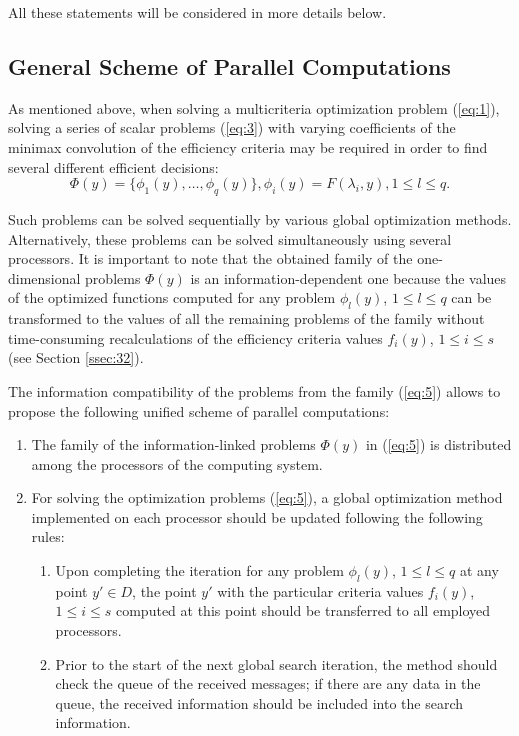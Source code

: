All these statements will be considered in more details below.


\subsection{General Scheme of Parallel Computations }
\label{ssec:31}

As mentioned above, when solving a multicriteria optimization problem (\ref{eq:1}), solving a series of scalar problems (\ref{eq:3}) with varying coefficients of the minimax convolution of the efficiency criteria may be required in order to find several different efficient decisions:
\begin{equation}
\Phi(y)=\{\phi_1 (y),\dots,\phi_q(y) \}, \phi_i(y)=F(\lambda_i,y), 1 \leq l \leq q.
\label{eq:5}
\end{equation}

Such problems can be solved sequentially by various global optimization methods. Alternatively, these problems can be solved simultaneously using several processors. It is important to note that the obtained family of the one-dimensional problems $\Phi(y)$ is an information-dependent one because the values of the optimized functions computed for any problem $\phi_l (y)$, $1 \leq l \leq q$ can be transformed to the values of all the remaining problems of the family without time-consuming recalculations of the efficiency criteria values $f_i (y)$, $1 \leq i \leq s$ (see Section \ref{ssec:32}).

The information compatibility of the problems from the family (\ref{eq:5}) allows to propose the following unified scheme of parallel computations:
\begin{enumerate}
	\item The family of the information-linked problems $\Phi(y)$ in (\ref{eq:5}) is distributed among the processors of the computing system. 
  \item For solving the optimization problems (\ref{eq:5}), a global optimization method implemented on each processor should be updated following the following rules:
  \begin{enumerate}
		\item Upon completing the iteration for any problem $\phi_l(y)$, $1 \leq l \leq q$ at any point $y' \in D$, the point $y'$ with the particular criteria values $f_i(y)$, $1 \leq i \leq s$ computed at this point should be transferred to all employed processors.
	  \item Prior to the start of the next global search iteration, the method should check the queue of the received messages; if there are any data in the queue, the received information should be included into the search information.
	\end{enumerate}
\end{enumerate}
	
